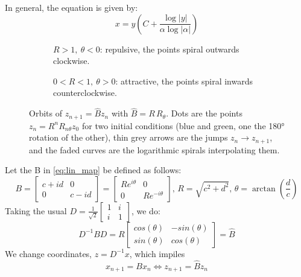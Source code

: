 \begin{example}
    In general, the equation is given by:\begin{equation*}
        x=y(C+\frac{\log|y|}{\alpha \log|\alpha|})
    \end{equation*}
\end{example}

\begin{example}
    \begin{figure}[ht]
        \centering
        \begin{subfigure}[t]{0.48\textwidth}
            \centering
            \caption{$R>1,\ \theta<0$: repulsive, the points spiral outwards clockwise.}
        \end{subfigure}\hfill
        \begin{subfigure}[t]{0.48\textwidth}
            \centering
            \caption{$0<R<1,\ \theta>0$: attractive, the points spiral inwards counterclockwise.}
        \end{subfigure}

        \caption{Orbits of $z_{n+1}=\hat{B}z_n$ with $\hat{B}=R\,R_\theta$. Dots are the points
        $z_n=R^nR_{n\theta}z_0$ for two initial conditions (blue and green, one the 180° rotation of the other),
        thin grey arrows are the jumps $z_n\to z_{n+1}$, and the faded curves are the
        logarithmic spirals interpolating them.}
        \label{fig:spiral_maps}
    \end{figure}
    Let the B in \autoref{eq:lin_map} be defined as follows:
    \begin{equation*}
        B=\begin{bmatrix}
            c+id & 0 \\ 0 & c-id
        \end{bmatrix}=\begin{bmatrix}
            Re^{i\theta} & 0 \\ 0 & Re^{-i\theta}
        \end{bmatrix},\, R=\sqrt{c^2+d^2},\, \theta=\arctan\left(\frac{d}{c}\right)
    \end{equation*}
    Taking the usual $D=
        \frac{1}{\sqrt{2}}\begin{bmatrix} 1 & i \\ i & 1
    \end{bmatrix}$, we do:\begin{equation*}
        D^{-1}BD=R\begin{bmatrix}
            cos(\theta) & -sin(\theta) \\
            sin(\theta) & cos(\theta)
        \end{bmatrix}=\hat{B}
    \end{equation*}
    We change coordinates, $z=D^{-1}x$, which impiles \begin{equation*}
        x_{n+1}=Bx_n \iff z_{n+1}=\hat{B}z_n
    \end{equation*}


\end{example}
